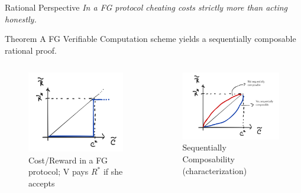 \begin{frame}[t]{Rational Perspective}
\textit{In a FG protocol cheating costs strictly more than acting honestly.}\pause\\\medskip

\begin{block}{Theorem}
	A FG Verifiable Computation scheme yields a sequentially composable rational proof.
\end{block}
\begin{columns}
	\begin{figure}
		\includegraphics[scale=0.14]{pics/fg-sc.png}
		\caption{Cost/Reward in a FG protocol; V pays $R^*$ if she accepts}
	\end{figure}
		\begin{figure}
			\includegraphics[scale=0.15]{pics/sc-char.png}
			\caption{Sequentially Composability (characterization)}
		\end{figure}
			
\end{columns}
\end{frame}

